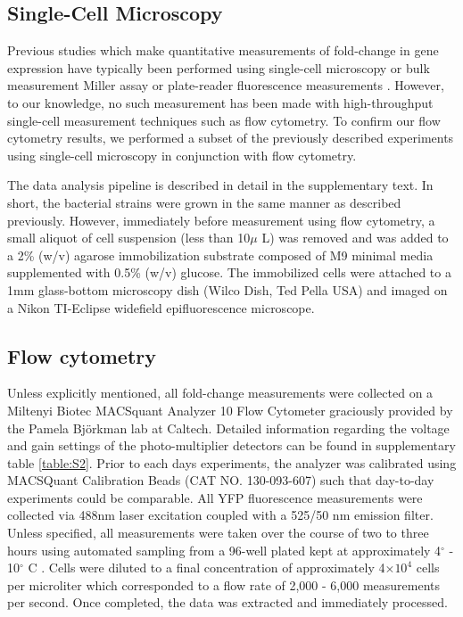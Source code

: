 \subsection*{Single-Cell Microscopy}
Previous studies which make quantitative measurements of fold-change in gene
expression have typically been performed using single-cell microscopy
\cite{Brewster2014, Jones2014} or bulk measurement Miller assay or plate-reader
fluorescence measurements \cite{Garcia2011, Razo-Mejia2014}. However, to our
knowledge, no such measurement has been made with high-throughput single-cell
measurement techniques such as flow cytometry. To confirm our flow cytometry
results, we performed a subset of the previously described experiments using
single-cell microscopy in conjunction with flow cytometry.

The data analysis pipeline is described in detail in the supplementary text. In
short, the bacterial strains were grown in the same manner as described
previously. However, immediately before measurement using flow cytometry, a
small aliquot of cell suspension (less than 10$\mu$ L) was removed and was
added to a 2\% (w/v) agarose immobilization substrate composed of M9 minimal
media supplemented with 0.5\% (w/v) glucose. The immobilized cells were
attached to a 1mm glass-bottom microscopy dish (Wilco Dish, Ted Pella USA) and
imaged on a Nikon TI-Eclipse widefield epifluorescence microscope.

\subsection*{Flow cytometry}
Unless explicitly mentioned, all fold-change measurements were collected on a
Miltenyi Biotec MACSquant Analyzer 10 Flow Cytometer graciously provided by the
Pamela Bj\"{o}rkman lab at Caltech. Detailed information regarding the voltage
and gain  settings of the photo-multiplier detectors can be found in
supplementary table \ref{table:S2}. Prior to each days experiments, the
analyzer was calibrated using MACSQuant Calibration Beads (CAT NO. 130-093-607)
such that day-to-day experiments could be comparable. All YFP fluorescence
measurements were collected via 488nm laser excitation  coupled with a 525/50
nm emission filter. Unless specified, all measurements were  taken over the
course of two to three hours using automated sampling from a 96-well plated
kept at approximately 4$^\circ$ - 10$^\circ$ C . Cells were diluted to a final concentration of
approximately 4$\times 10^{4}$ cells per microliter which corresponded to a
flow rate of 2,000 - 6,000 measurements per second.
 Once completed, the data
was extracted and immediately  processed. 

